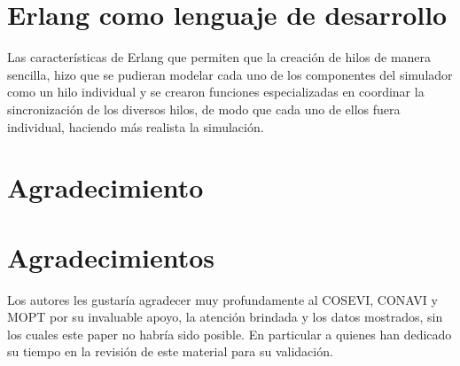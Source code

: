 \documentclass[conference]{IEEEtran}
\begin{document}
\appendices
\section{Erlang como lenguaje de desarrollo}
Las caracter\'isticas de Erlang que permiten que la creaci\'on de hilos de manera sencilla, hizo que se pudieran modelar cada uno de los componentes del simulador como un hilo individual y se crearon funciones especializadas en coordinar la sincronizaci\'on de los diversos hilos, de modo que cada uno de ellos fuera individual, haciendo m\'as realista la simulaci\'on.

\ifCLASSOPTIONcompsoc
  \section*{Agradecimiento}
\else
  \section*{Agradecimientos}
\fi


Los autores les gustar\'ia agradecer muy profundamente al COSEVI, CONAVI y MOPT por su invaluable apoyo, la atenci\'on brindada y los datos mostrados, sin los cuales este paper no habr\'ia sido posible. En particular a quienes han dedicado su tiempo en la revisi\'on de este material para su validaci\'on.%


\ifCLASSOPTIONcaptionsoff
  \newpage
\fi





%
%
%
\end{document}
